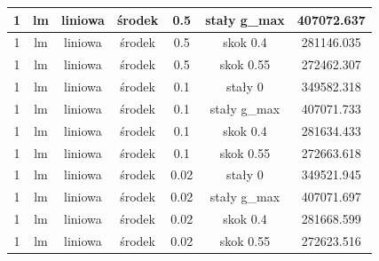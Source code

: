 \documentclass[11pt]{article}
\begin{document}
\begin{table}[h]
\begin{center}
\begin{tabular}{|c|c|c|c|c|c|c|}
      \hline
      1 & lm & liniowa & środek & 0.5 & stały g_max & 407072.637 \\
      \hline
      1 & lm & liniowa & środek & 0.5 & skok 0.4 & 281146.035 \\
      \hline
      1 & lm & liniowa & środek & 0.5 & skok 0.55 & 272462.307 \\
      \hline
      1 & lm & liniowa & środek & 0.1 & stały 0 & 349582.318 \\
      \hline
      1 & lm & liniowa & środek & 0.1 & stały g_max & 407071.733 \\
      \hline
      1 & lm & liniowa & środek & 0.1 & skok 0.4 & 281634.433 \\
      \hline
      1 & lm & liniowa & środek & 0.1 & skok 0.55 & 272663.618 \\
      \hline
      1 & lm & liniowa & środek & 0.02 & stały 0 & 349521.945 \\
      \hline
      1 & lm & liniowa & środek & 0.02 & stały g_max & 407071.697 \\
      \hline
      1 & lm & liniowa & środek & 0.02 & skok 0.4 & 281668.599 \\
      \hline
      1 & lm & liniowa & środek & 0.02 & skok 0.55 & 272623.516 \\
      \hline
    \end{tabular}
  \end{center}
\end{table}

\newpage{}
{}

\end{document}

